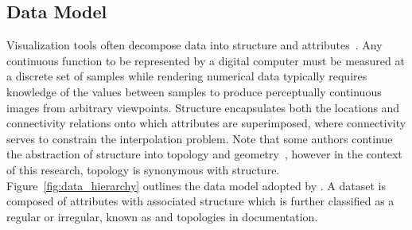 \subsection{Data Model}
Visualization tools often decompose data into structure and
attributes~\cite{vtk}. Any continuous function to be represented by a
digital computer must be measured at a discrete set of samples while
rendering numerical data typically requires knowledge of the values
between samples to produce perceptually continuous images from
arbitrary viewpoints. Structure encapsulates both the locations and
connectivity relations onto which attributes are superimposed, where
connectivity serves to constrain the interpolation problem. Note that
some authors continue the abstraction of structure into topology and
geometry~\cite{weiler}, however in the context of this research,
topology is synonymous with structure. Figure~\ref{fig:data_hierarchy}
outlines the data model adopted by \sciwms{}. A dataset is composed of
attributes with associated structure which is further classified as a
regular or irregular, known as \cgrid{} and \ugrid{} topologies in
\sciwms{} documentation.
